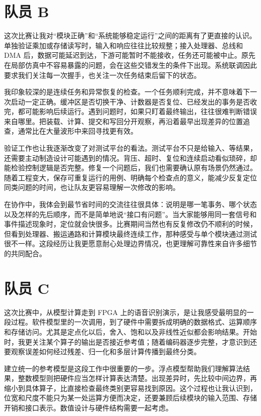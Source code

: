 \documentclass[UTF8,a4paper,zihao=-4,fontset=none,openany,oneside]{ctexrep}
\begin{document}
\section*{队员 B}

这次比赛让我对“模块正确”和“系统能够稳定运行”之间的距离有了更直接的认识。单独验证乘加或存储读写时，输入和响应往往比较规整；接入处理器、总线和 DMA 后，数据可能延迟到达，下游可能暂时不能接收，任务还可能被中止。原先在局部仿真中不容易暴露的问题，会在这些交错发生的条件下出现。系统联调因此要求我们关注每一次握手，也关注一次任务结束后留下的状态。

我印象较深的是连续任务和异常恢复的检查。一个任务顺利完成，并不意味着下一次启动一定正确。缓冲区是否切换干净、计数器是否复位、已经发出的事务是否收完，都可能影响后续运行。遇到问题时，如果只盯着最终输出，往往很难判断错误来自哪里。把装载、计算、提交和写回分开观察，再沿着最早出现差异的位置追查，通常比在大量波形中来回寻找更有效。

验证工作也让我逐渐改变了对测试平台的看法。测试平台不只是给输入、等结果，还需要主动制造设计可能遇到的情况。背压、超时、复位和连续启动看似琐碎，却能检验控制逻辑是否完整。修复一个问题后，我们也需要确认原有场景仍然通过。随着工程变大，保存可重复运行的用例、明确每个检查点的意义，能减少反复定位同类问题的时间，也让队友更容易理解一次修改的影响。

在协作中，我体会到最节省时间的交流往往很具体：说明是哪一笔事务、哪个状态以及怎样的先后顺序，而不是简单地说“接口有问题”。当大家能够用同一套信号和事件描述现象时，定位就会快很多。比赛期间当然也有反复修改仍不顺利的时候，但看到处理器、搬运通路和计算模块最终连续工作，那种感受与单个模块通过测试很不一样。这段经历让我更愿意耐心处理边界情况，也更理解可靠性来自许多细节的共同配合。

\section*{队员 C}

这次比赛中，从模型计算走到 FPGA 上的语音识别演示，是让我感受最明显的一段过程。软件模型里的一次调用，到了硬件中需要拆成明确的数据格式、运算顺序和存储访问。尤其是定点化以后，舍入、饱和以及非线性近似都会影响结果。开始时，我更关注某个算子的输出是否接近参考值；随着编码器逐步完整，才意识到还要观察误差如何经过残差、归一化和多层计算传播到最终分类。

建立统一的参考模型是这段工作中很重要的一步。浮点模型帮助我们理解算法结果，整数模型则把硬件应当怎样计算表达清楚。出现差异时，先比较中间边界，再缩小到具体算子，比直接检查最终类别更容易找到原因。这个过程也让我认识到，位宽和尺度不能只为某一处运算方便而决定，还要兼顾后续模块的输入范围、存储开销和接口表示。数值设计与硬件结构需要一起考虑。
\end{document}
